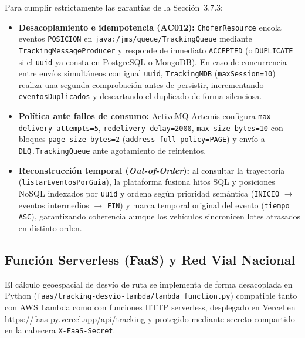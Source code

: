 \documentclass[11pt,a4paper,twocolumn]{article}
\begin{document}
Para cumplir estrictamente las garantías de la Sección~3.7.3:
\begin{itemize}
    \item \textbf{Desacoplamiento e idempotencia (AC012):} \texttt{ChoferResource} encola eventos \texttt{POSICION} en \texttt{java:/jms/queue/TrackingQueue} mediante \texttt{TrackingMessageProducer} y responde de inmediato \texttt{ACCEPTED} (o \texttt{DUPLICATE} si el \texttt{uuid} ya consta en PostgreSQL o MongoDB). En caso de concurrencia entre envíos simultáneos con igual \texttt{uuid}, \texttt{TrackingMDB} (\texttt{maxSession=10}) realiza una segunda comprobación antes de persistir, incrementando \texttt{eventosDuplicados} y descartando el duplicado de forma silenciosa.
    \item \textbf{Política ante fallos de consumo:} ActiveMQ Artemis configura \texttt{max-delivery-attempts=5}, \texttt{redelivery-delay=2000}, \texttt{max-size-bytes=10} con bloques \texttt{page-size-bytes=2} (\texttt{address-full-policy=PAGE}) y envío a \texttt{DLQ.TrackingQueue} ante agotamiento de reintentos.
    \item \textbf{Reconstrucción temporal (\textit{Out-of-Order}):} al consultar la trayectoria (\texttt{listarEventosPorGuia}), la plataforma fusiona hitos SQL y posiciones NoSQL indexados por \texttt{uuid} y ordena según prioridad semántica (\texttt{INICIO} $\rightarrow$ eventos intermedios $\rightarrow$ \texttt{FIN}) y marca temporal original del evento (\texttt{tiempo ASC}), garantizando coherencia aunque los vehículos sincronicen lotes atrasados en distinto orden.
\end{itemize}

\subsection{Función Serverless (FaaS) y Red Vial Nacional}

El cálculo geoespacial de desvío de ruta se implementa de forma desacoplada en Python (\texttt{faas/tracking-desvio-lambda/lambda\_function.py}) compatible tanto con AWS Lambda como con funciones HTTP serverless, desplegado en Vercel en \url{https://faas-py.vercel.app/api/tracking} y protegido mediante secreto compartido en la cabecera \texttt{X-FaaS-Secret}.
\end{document}
